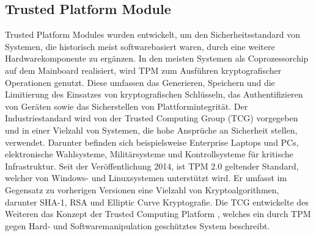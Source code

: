 \documentclass[conference]{IEEEtran}
\begin{document}
\subsection{Trusted Platform Module}
Trusted Platform Modules wurden entwickelt, um den Sicherheitsstandard von Systemen, die historisch meist softwarebasiert waren, durch eine weitere Hardwarekomponente zu ergänzen. In den meisten Systemen als Coprozessorchip auf dem Mainboard realisiert, wird TPM zum Ausführen kryptografischer Operationen genutzt. Diese umfassen das Generieren, Speichern und die Limitierung des Einsatzes von kryptografischen Schlüsseln, das Authentifizieren von Geräten sowie das Sicherstellen von Plattformintegrität. Der Industriestandard wird von der Trusted Computing Group (TCG) vorgegeben und in einer Vielzahl von Systemen, die hohe Ansprüche an Sicherheit stellen, verwendet. Darunter befinden sich beispielsweise Enterprise Laptops und PCs, elektronische Wahlsysteme, Militärsysteme und Kontrollsysteme für kritische Infrastruktur. Seit der Veröffentlichung 2014, ist TPM 2.0 \cite{TrustedComputingGroup.30072020} geltender Standard, welcher von Windows- und Linuxsystemen unterstützt wird. Er umfasst im Gegensatz zu vorherigen Versionen eine Vielzahl von Kryptoalgorithmen, darunter SHA-1, RSA und Elliptic Curve Kryptografie. Die TCG entwickelte des Weiteren das Konzept der Trusted Computing Platform \cite[S. 37-107]{Proudler.2014}, welches ein durch TPM gegen Hard- und Softwaremanipulation geschütztes System beschreibt.	
\end{document}
